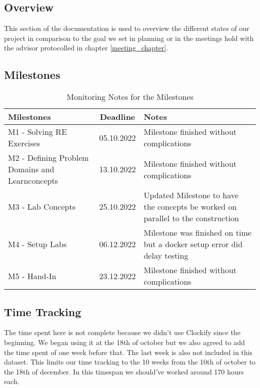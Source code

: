 \subsection{Overview}
This section of the documentation is used to overview the different states of our project in comparison to the goal we set in planning or in the meetings hold with the advisor protocolled in chapter \ref*{meeting_chapter}.

\subsection{Milestones}

\begin{table}[H]
    \centering
    \begin{tabular}[]{|| p{5cm} | c | p{6.2cm} ||}
        \hline
        Milestones & Deadline & Notes \\
        \hline \hline
        M1 - Solving RE Exercises & 05.10.2022 & Milestone finished without complications \\
        \hline
        M2 - Defining Problem Domains and Learnconcepts& 13.10.2022 & Milestone finished without complications \\
        \hline
        M3 - Lab Concepts & 25.10.2022 & Updated Milestone to have the concepts be worked on parallel to the construction \\
        \hline
        M4 - Setup Labs & 06.12.2022 & Milestone was finished on time but a docker setup error did delay testing\\
        \hline
        M5 - Hand-In & 23.12.2022 & Milestone finished without complications \\
        \hline
    \end{tabular}
    \caption{Monitoring Notes for the Milestones}
    \label{milestones_monitoring_table}
\end{table}

\subsection{Time Tracking}

The time spent here is not complete because we didn't use Clockify since the beginning. We began using it at the 18th of october but we also agreed to add the time spent of one week before that. The last week is also not included in this dataset. This limits our time tracking to the 10 weeks from the 10th of october to the 18th of december. In this timespan we should've worked around 170 hours each.

